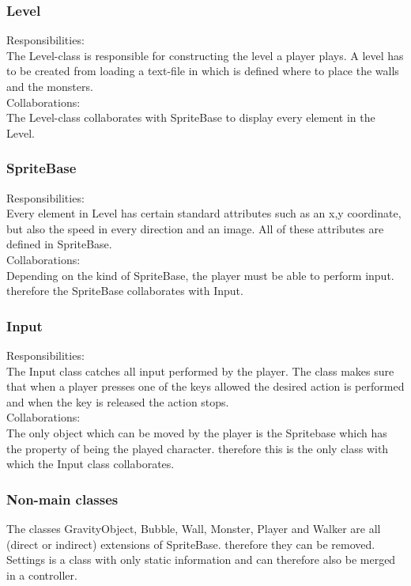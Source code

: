 \subsubsection{Level}
Responsibilities: \\
The Level-class is responsible for constructing the level a player plays. A level has to be created from loading a text-file in which is defined where to place the walls and the monsters. \\
Collaborations: \\
The Level-class collaborates with SpriteBase to display every element in the Level.  

\subsubsection{SpriteBase}
Responsibilities: \\
Every element in Level has certain standard attributes such as an x,y coordinate, but also the speed in every direction and an image. All of these attributes are defined in SpriteBase. \\
Collaborations: \\
Depending on the kind of SpriteBase, the player must be able to perform input. therefore the SpriteBase collaborates with Input. 

\subsubsection{Input}
Responsibilities: \\
The Input class catches all input performed by the player. The class makes sure that when a player presses one of the keys allowed the desired action is performed and when the key is released the action stops. \\
Collaborations: \\
The only object which can be moved by the player is the Spritebase which has the property of being the played character. therefore this is the only class with which the Input class collaborates. 

\subsubsection{Non-main classes}
The classes GravityObject, Bubble, Wall, Monster, Player and Walker are all (direct or indirect) extensions of SpriteBase. therefore they can be removed. Settings is a class with only static information and can therefore also be merged in a controller. 